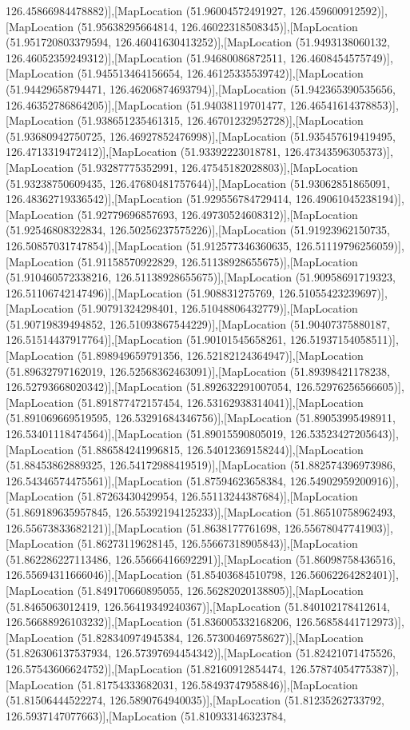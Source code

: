 126.45866984478882)],[MapLocation (51.96004572491927, 126.459600912592)],[MapLocation (51.95638295664814, 126.46022318508345)],[MapLocation (51.951720803379594, 126.46041630413252)],[MapLocation (51.9493138060132, 126.46052359249312)],[MapLocation (51.94680086872511, 126.4608454575749)],[MapLocation (51.945513464156654, 126.46125335539742)],[MapLocation (51.94429658794471, 126.46206874693794)],[MapLocation (51.942365390535656, 126.46352786864205)],[MapLocation (51.94038119701477, 126.46541614378853)],[MapLocation (51.938651235461315, 126.46701232952728)],[MapLocation (51.93680942750725, 126.46927852476998)],[MapLocation (51.935457619419495, 126.4713319472412)],[MapLocation (51.93392223018781, 126.47343596305373)],[MapLocation (51.93287775352991, 126.47545182028803)],[MapLocation (51.93238750609435, 126.47680481757644)],[MapLocation (51.93062851865091, 126.48362719336542)],[MapLocation (51.929556784729414, 126.49061045238194)],[MapLocation (51.92779696857693, 126.49730524608312)],[MapLocation (51.92546808322834, 126.50256237575226)],[MapLocation (51.91923962150735, 126.50857031747854)],[MapLocation (51.912577346360635, 126.51119796256059)],[MapLocation (51.91158570922829, 126.51138928655675)],[MapLocation (51.910460572338216, 126.51138928655675)],[MapLocation (51.90958691719323, 126.51106742147496)],[MapLocation (51.908831275769, 126.51055423239697)],[MapLocation (51.90791324298401, 126.51048806432779)],[MapLocation (51.90719839494852, 126.51093867544229)],[MapLocation (51.90407375880187, 126.51514437917764)],[MapLocation (51.90101545658261, 126.51937154058511)],[MapLocation (51.898949659791356, 126.52182124364947)],[MapLocation (51.89632797162019, 126.52568362463091)],[MapLocation (51.89398421178238, 126.52793668020342)],[MapLocation (51.892632291007054, 126.52976256566605)],[MapLocation (51.891877472157454, 126.53162938314041)],[MapLocation (51.891069669519595, 126.53291684346756)],[MapLocation (51.89053995498911, 126.53401118474564)],[MapLocation (51.89015590805019, 126.53523427205643)],[MapLocation (51.886584241996815, 126.54012369158244)],[MapLocation (51.88453862889325, 126.54172988419519)],[MapLocation (51.882574396973986, 126.54346574475561)],[MapLocation (51.87594623658384, 126.54902959200916)],[MapLocation (51.87263430429954, 126.55113244387684)],[MapLocation (51.869189635957845, 126.55392194125233)],[MapLocation (51.86510758962493, 126.55673833682121)],[MapLocation (51.8638177761698, 126.55678047741903)],[MapLocation (51.86273119628145, 126.55667318905843)],[MapLocation (51.862286227113486, 126.55666416692291)],[MapLocation (51.86098758436516, 126.55694311666046)],[MapLocation (51.85403684510798, 126.56062264282401)],[MapLocation (51.849170660895055, 126.56282020138805)],[MapLocation (51.8465063012419, 126.56419349240367)],[MapLocation (51.840102178412614, 126.56688926103232)],[MapLocation (51.836005332168206, 126.56858441712973)],[MapLocation (51.828340974945384, 126.57300469758627)],[MapLocation (51.826306137537934, 126.57397694454342)],[MapLocation (51.82421071475526, 126.57543606624752)],[MapLocation (51.82160912854474, 126.57874054775387)],[MapLocation (51.81754333682031, 126.58493747958846)],[MapLocation (51.81506444522274, 126.5890764940035)],[MapLocation (51.81235262733792, 126.5937147077663)],[MapLocation (51.810933146323784, 